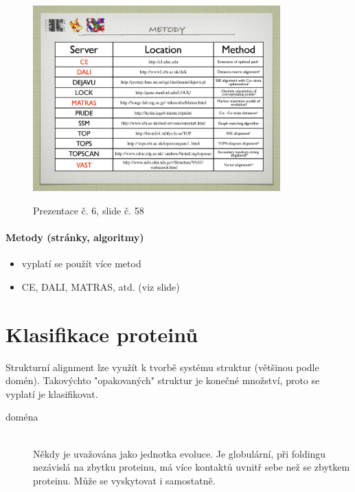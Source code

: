 \documentclass[DIV=8]{scrreprt}
\begin{document}
\begin{figure}
    \caption{Prezentace č. 6, slide č. 58}
    \includegraphics[width=0.85\textwidth]{slides-6/slide-58.jpg}
    \centering
    \label{slides-6-slide-58}
\end{figure}

\paragraph{Metody (stránky, algoritmy)}
\begin{itemize}[nosep]
    \item vyplatí se použít více metod
    \item CE, DALI, MATRAS, atd. (viz slide)
\end{itemize}



\section{Klasifikace proteinů} \label{Klasifikace proteinů}


Strukturní alignment lze využít k tvorbě systému struktur (většinou podle domén). Takovýchto "opakovaných" struktur je konečné množství, proto se vyplatí je klasifikovat.

\begin{description}
\item[doména]\hfill \\
Někdy je uvažována jako jednotka evoluce. Je globulární, při foldingu nezávislá na zbytku proteinu, má více kontaktů uvnitř sebe než se zbytkem proteinu. Může se vyskytovat i samostatně.

\end{description}
\end{document}
